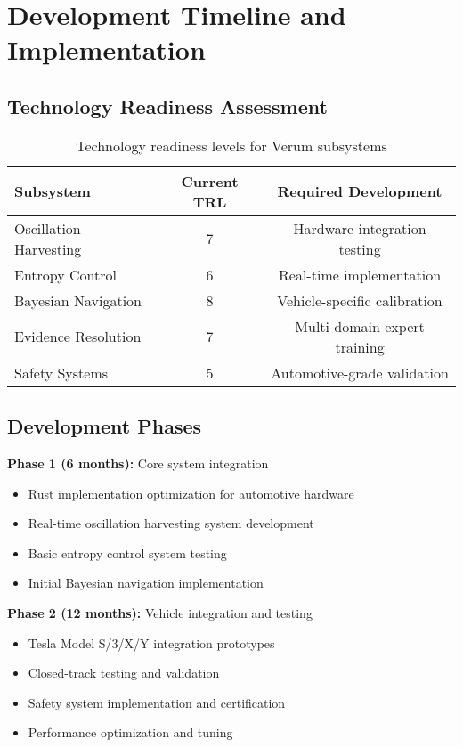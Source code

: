 \documentclass[11pt,a4paper]{article}
\begin{document}
\section{Development Timeline and Implementation}

\subsection{Technology Readiness Assessment}

\begin{table}[H]
\centering
\begin{tabular}{@{}lcc@{}}
\toprule
\textbf{Subsystem} & \textbf{Current TRL} & \textbf{Required Development} \\
\midrule
Oscillation Harvesting & 7 & Hardware integration testing \\
Entropy Control & 6 & Real-time implementation \\
Bayesian Navigation & 8 & Vehicle-specific calibration \\
Evidence Resolution & 7 & Multi-domain expert training \\
Safety Systems & 5 & Automotive-grade validation \\
\bottomrule
\end{tabular}
\caption{Technology readiness levels for Verum subsystems}
\label{tab:trl_verum}
\end{table}

\subsection{Development Phases}

\textbf{Phase 1 (6 months):} Core system integration
\begin{itemize}
    \item Rust implementation optimization for automotive hardware
    \item Real-time oscillation harvesting system development
    \item Basic entropy control system testing
    \item Initial Bayesian navigation implementation
\end{itemize}

\textbf{Phase 2 (12 months):} Vehicle integration and testing
\begin{itemize}
    \item Tesla Model S/3/X/Y integration prototypes
    \item Closed-track testing and validation
    \item Safety system implementation and certification
    \item Performance optimization and tuning
\end{itemize}
\end{document}
